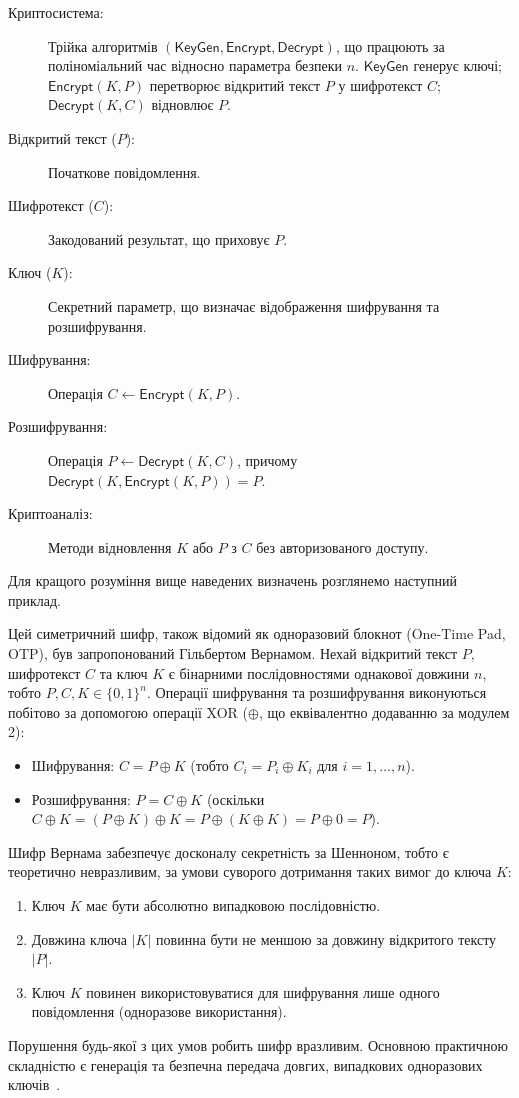 \begin{description}
    \item[Криптосистема:] Трійка алгоритмів \((\mathsf{KeyGen},\mathsf{Encrypt},\mathsf{Decrypt})\), що працюють за поліноміальний час відносно параметра безпеки \(n\).
    \(\mathsf{KeyGen}\) генерує ключі; \(\mathsf{Encrypt}(K,P)\) перетворює відкритий текст \(P\) у шифротекст \(C\); \(\mathsf{Decrypt}(K,C)\) відновлює \(P\).
    \item[Відкритий текст (\(P\)):] Початкове повідомлення.
    \item[Шифротекст (\(C\)):] Закодований результат, що приховує \(P\).
    \item[Ключ (\(K\)):] Секретний параметр, що визначає відображення шифрування та розшифрування.
    \item[Шифрування:] Операція \(C \leftarrow \mathsf{Encrypt}(K,P)\).
    \item[Розшифрування:] Операція \(P \leftarrow \mathsf{Decrypt}(K,C)\), причому \\ \(\mathsf{Decrypt}(K, \mathsf{Encrypt}(K,P)) = P\).
    \item[Криптоаналіз:] Методи відновлення \(K\) або \(P\) з \(C\) без авторизованого доступу.
\end{description}

Для кращого розуміння вище наведених визначень розглянемо наступний приклад.

\begin{example}
    \label{ex:otp_vernam}
    Цей симетричний шифр, також відомий як одноразовий блокнот (One-Time Pad, OTP), був запропонований Гільбертом Вернамом.
    Нехай відкритий текст \(P\), шифротекст \(C\) та ключ \(K\) є бінарними послідовностями однакової довжини \(n\), тобто \(P, C, K \in \{0, 1\}^n\).
    Операції шифрування та розшифрування виконуються побітово за допомогою операції XOR (\(\oplus\), що еквівалентно додаванню за модулем 2):
    \begin{itemize}
        \item Шифрування: \(C = P \oplus K\) (тобто \(C_i = P_i \oplus K_i\) для \(i=1, \dots, n\)).
        \item Розшифрування: \(P = C \oplus K\) (оскільки \(C \oplus K = (P \oplus K) \oplus K = P \oplus (K \oplus K) = P \oplus 0 = P\)).
    \end{itemize}
    Шифр Вернама забезпечує досконалу секретність за Шенноном, тобто є теоретично невразливим, за умови суворого дотримання таких вимог до ключа \(K\):
    \begin{enumerate}
        \item Ключ \(K\) має бути абсолютно випадковою послідовністю.
        \item Довжина ключа \(|K|\) повинна бути не меншою за довжину відкритого тексту \(|P|\).
        \item Ключ \(K\) повинен використовуватися для шифрування лише одного повідомлення (одноразове використання).
    \end{enumerate}
    Порушення будь-якої з цих умов робить шифр вразливим.
    Основною практичною складністю є генерація та безпечна передача довгих, випадкових одноразових ключів~\cite{Shannon49}.
\end{example}


